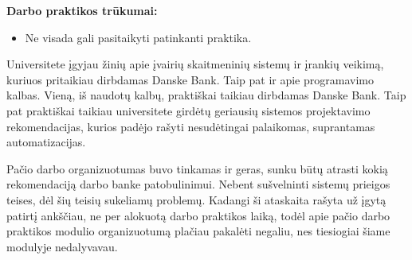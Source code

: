 \documentclass{VUMIFPSBakPrakAt}
\begin{document}
\vspace{10pt}
\par
\textbf{Darbo praktikos trūkumai:}
\vspace{10pt}
\begin{itemize}
    \item Ne visada gali pasitaikyti patinkanti praktika.
\end{itemize}
\vspace{10pt}
\par
Universitete įgyjau žinių apie įvairių skaitmeninių sistemų ir įrankių veikimą, kuriuos pritaikiau dirbdamas Danske Bank. Taip pat ir apie programavimo kalbas. Vieną, iš naudotų kalbų, praktiškai taikiau dirbdamas Danske Bank. Taip pat praktiškai taikiau universitete girdėtų geriausių sistemos projektavimo rekomendacijas, kurios padėjo rašyti nesudėtingai palaikomas, suprantamas automatizacijas. 
\par
Pačio darbo organizuotumas buvo tinkamas ir geras, sunku būtų atrasti kokią rekomendaciją darbo banke patobulinimui. Nebent sušvelninti sistemų prieigos teises, dėl šių teisių sukeliamų problemų. Kadangi ši ataskaita rašyta už įgytą patirtį ankščiau, ne per alokuotą darbo praktikos laiką, todėl apie pačio darbo praktikos modulio organizuotumą plačiau pakalėti negaliu, nes tiesiogiai šiame modulyje nedalyvavau.

\printbibliography[heading=bibintoc]
\end{document}
